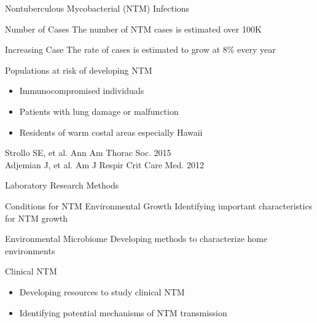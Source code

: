\documentclass[11pt]{beamer}
\begin{document}
	\begin{frame}{Nontuberculous Mycobacterial (NTM) Infections}
		\begin{block}{Number of Cases}
		The number of NTM cases is estimated over 100K
		\end{block}
		
		\begin{block}{Increasing Case}
		The rate of cases is estimated to grow at 8\% every year
		\end{block}
		
		
		\begin{block}{Populations at risk of developing NTM}
		\begin{itemize}
		\item Immunocompromised individuals 
		\item Patients with lung damage or malfunction 
		\item Residents of warm costal areas especially Hawaii
		\end{itemize}
		\end{block} 
		
		\begin{block}
		
		\end{block}
	\vspace{-1cm}
	\tiny{Strollo SE, et al. Ann Am Thorac Soc. 2015 \\
	Adjemian J, et al. Am J Respir Crit Care Med. 2012}
	
	\end{frame}
	\begin{frame}{Laboratory Research Methods}
	\begin{block}{Conditions for NTM Environmental Growth}
	Identifying important characteristics for NTM growth 
	\end{block}
	
	\begin{block}{Environmental Microbiome}
	Developing methods to characterize home environments
	\end{block}
	
	\begin{block}{Clinical NTM}
	\begin{itemize}
	\item Developing resources to study clinical NTM
	\item Identifying potential mechanisms of NTM transmission
	\end{itemize}
	\end{block}

	
	\end{frame}
	
\end{document}
